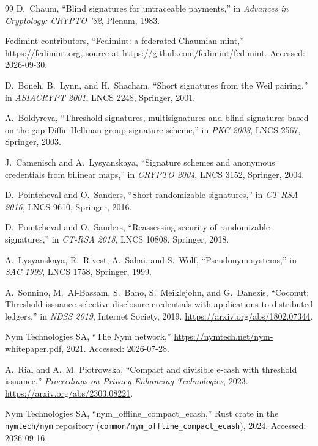 \documentclass[10pt,a5paper]{article}
\begin{document}
\begin{thebibliography}{99}
D.~Chaum, ``Blind signatures for untraceable payments,'' in \emph{Advances in
Cryptology: CRYPTO '82}, Plenum, 1983.

Fedimint contributors, ``Fedimint: a federated Chaumian mint,''
\url{https://fedimint.org}, source at
\url{https://github.com/fedimint/fedimint}. Accessed: 2026-09-30.

D.~Boneh, B.~Lynn, and H.~Shacham, ``Short signatures from the Weil pairing,''
in \emph{ASIACRYPT 2001}, LNCS 2248, Springer, 2001.

A.~Boldyreva, ``Threshold signatures, multisignatures and blind signatures
based on the gap-Diffie-Hellman-group signature scheme,'' in \emph{PKC 2003},
LNCS 2567, Springer, 2003.

J.~Camenisch and A.~Lysyanskaya, ``Signature schemes and anonymous credentials
from bilinear maps,'' in \emph{CRYPTO 2004}, LNCS 3152, Springer, 2004.

D.~Pointcheval and O.~Sanders, ``Short randomizable signatures,'' in
\emph{CT-RSA 2016}, LNCS 9610, Springer, 2016.

D.~Pointcheval and O.~Sanders, ``Reassessing security of randomizable
signatures,'' in \emph{CT-RSA 2018}, LNCS 10808, Springer, 2018.

A.~Lysyanskaya, R.~Rivest, A.~Sahai, and S.~Wolf, ``Pseudonym systems,'' in
\emph{SAC 1999}, LNCS 1758, Springer, 1999.

A.~Sonnino, M.~Al-Bassam, S.~Bano, S.~Meiklejohn, and G.~Danezis,
``Coconut: Threshold issuance selective disclosure credentials with applications
to distributed ledgers,'' in \emph{NDSS 2019}, Internet Society, 2019.
\url{https://arxiv.org/abs/1802.07344}.

Nym Technologies SA, ``The Nym network,''
\url{https://nymtech.net/nym-whitepaper.pdf}, 2021. Accessed: 2026-07-28.

A.~Rial and A.~M. Piotrowska, ``Compact and divisible e-cash with threshold
issuance,'' \emph{Proceedings on Privacy Enhancing Technologies}, 2023.
\url{https://arxiv.org/abs/2303.08221}.

Nym Technologies SA, ``nym\_offline\_compact\_ecash,'' Rust crate in the
\texttt{nymtech/nym} repository (\texttt{common/nym\_offline\_compact\_ecash}),
2024. Accessed: 2026-09-16.


\end{thebibliography}
\end{document}
